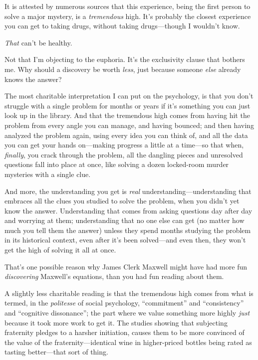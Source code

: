 {
 It is attested by numerous sources that this experience, being the
first person to solve a major mystery, is a \textit{tremendous} high.
It's probably the closest experience you can get to
taking drugs, without taking drugs---though I wouldn't
know.}

{
 \textit{That} can't be healthy.}

{
 Not that I'm objecting to the euphoria.
It's the exclusivity clause that bothers me. Why should
a discovery be worth \textit{less}, just because someone \textit{else}
already knows the answer?}

{
 The most charitable interpretation I can put on the psychology, is
that you don't struggle with a single problem for
months or years if it's something you can just look up
in the library. And that the tremendous high comes from having hit the
problem from every angle you can manage, and having bounced; and then
having analyzed the problem again, using every idea you can think of,
and all the data you can get your hands on---making progress a little
at a time---so that when, \textit{finally}, you crack through the
problem, all the dangling pieces and unresolved questions fall into
place at once, like solving a dozen locked-room murder mysteries with a
single clue.}

{
 And more, the understanding you get is \textit{real}
understanding---understanding that embraces all the clues you studied
to solve the problem, when you didn't yet know the
answer. Understanding that comes from asking questions day after day
and worrying at them; understanding that no one else can get (no matter
how much you tell them the answer) unless they spend months studying
the problem in its historical context, even after it's
been solved---and even then, they won't get the high of
solving it all at once.}

{
 That's one possible reason why James Clerk Maxwell
might have had more fun \textit{discovering} Maxwell's
equations, than you had fun reading about them.}

{
 A slightly less charitable reading is that the tremendous high
comes from what is termed, in the \textit{politesse} of social
psychology, ``commitment'' and
``consistency'' and
``cognitive dissonance''; the part
where we value something more highly \textit{just} because it took more
work to get it. The studies showing that subjecting fraternity pledges
to a harsher initiation, causes them to be more convinced of the value
of the fraternity---identical wine in higher-priced bottles being rated
as tasting better---that sort of thing.}

